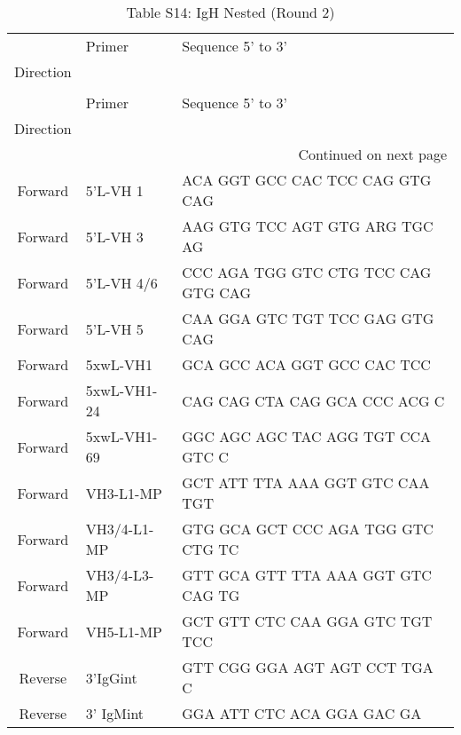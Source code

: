\documentclass{article}%
\begin{document}
%
\normalsize%
\fontsize{7}{12}%
\selectfont%
\captionsetup{labelformat=empty,justification=raggedright,margin=0cm,font=normalsize}%
\begin{longtable}{cll}
\caption{Table S14: IgH Nested (Round 2)}\\
\toprule
{} &       Primer &                    Sequence 5’ to 3’ \\
Direction &              &                                      \\
\midrule
\endfirsthead
\caption[]{Table S14: IgH Nested (Round 2)} \\
\toprule
{} &       Primer &                    Sequence 5’ to 3’ \\
Direction &              &                                      \\
\midrule
\endhead
\midrule
\multicolumn{3}{r}{{Continued on next page}} \\
\midrule
\endfoot

\bottomrule
\endlastfoot
Forward   &     5'L-VH 1 &      ACA GGT GCC CAC TCC CAG GTG CAG \\
Forward   &     5'L-VH 3 &       AAG GTG TCC AGT GTG ARG TGC AG \\
Forward   &   5'L-VH 4/6 &  CCC AGA TGG GTC CTG TCC CAG GTG CAG \\
Forward   &     5'L-VH 5 &      CAA GGA GTC TGT TCC GAG GTG CAG \\
Forward   &     5xwL-VH1 &          GCA GCC ACA GGT GCC CAC TCC \\
Forward   &  5xwL-VH1-24 &        CAG CAG CTA CAG GCA CCC ACG C \\
Forward   &  5xwL-VH1-69 &    GGC AGC AGC TAC AGG TGT CCA GTC C \\
Forward   &    VH3-L1-MP &      GCT ATT TTA AAA GGT GTC CAA TGT \\
Forward   &  VH3/4-L1-MP &   GTG GCA GCT CCC AGA TGG GTC CTG TC \\
Forward   &  VH3/4-L3-MP &   GTT GCA GTT TTA AAA GGT GTC CAG TG \\
Forward   &    VH5-L1-MP &      GCT GTT CTC CAA GGA GTC TGT TCC \\
Reverse   &     3'IgGint &        GTT CGG GGA AGT AGT CCT TGA C \\
Reverse   &    3' IgMint &           GGA ATT CTC ACA GGA GAC GA \\
\end{longtable}
%
%
\end{document}
